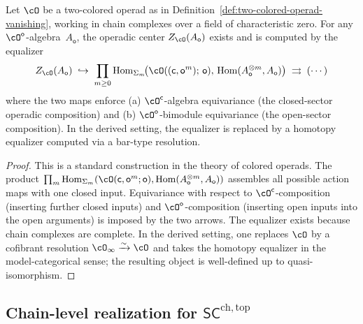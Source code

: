 \begin{proposition}
\label{prop:operadic-center-existence}
Let $\cO$ be a two-colored operad as in
Definition~\textup{\ref{def:two-colored-operad-vanishing}}, working
in chain complexes over a field of characteristic zero. For any
$\cO^{\mathsf{o}}$-algebra~$A_\mathsf{o}$, the operadic center
$Z_\cO(A_\mathsf{o})$ exists and is computed by the equalizer
\begin{equation}\label{eq:center-equalizer}
Z_\cO(A_\mathsf{o})
\;\hookrightarrow\;
\prod_{m \geq 0}
\operatorname{Hom}_{\Sigma_m}
\!\bigl(
\cO((\mathsf{c}, \mathsf{o}^m);\, \mathsf{o}),\,
\operatorname{Hom}(A_\mathsf{o}^{\otimes m}, A_\mathsf{o})
\bigr)
\;\rightrightarrows\;
(\cdots)
\end{equation}
where the two maps enforce
\textup{(}a\textup{)} $\cO^{\mathsf{c}}$-algebra equivariance
\textup{(}the closed-sector operadic composition\textup{)} and
\textup{(}b\textup{)} $\cO^{\mathsf{o}}$-bimodule equivariance
\textup{(}the open-sector composition\textup{)}. In the derived
setting, the equalizer is replaced by a homotopy equalizer computed
via a bar-type resolution.
\end{proposition}

\begin{proof}
This is a standard construction in the theory of colored operads.
The product
$\prod_m \operatorname{Hom}_{\Sigma_m}(\cO(\mathsf{c},
\mathsf{o}^m; \mathsf{o}), \operatorname{Hom}(A_\mathsf{o}^{\otimes m}, A_\mathsf{o}))$
assembles all possible action maps with one closed input.
Equivariance with respect to $\cO^{\mathsf{c}}$-composition
(inserting further closed inputs) and $\cO^{\mathsf{o}}$-composition
(inserting open inputs into the open arguments) is imposed by the
two arrows. The equalizer exists because chain complexes are complete.
In the derived setting, one replaces $\cO$ by a cofibrant resolution
$\cO_\infty \xrightarrow{\sim} \cO$ and takes the homotopy equalizer
in the model-categorical sense; the resulting object is well-defined
up to quasi-isomorphism.
\end{proof}


\subsection{Chain-level realization for
\texorpdfstring{$\mathsf{SC}^{\mathrm{ch,top}}$}{SC-ch,top}}
\label{subsec:center-chain-level}

